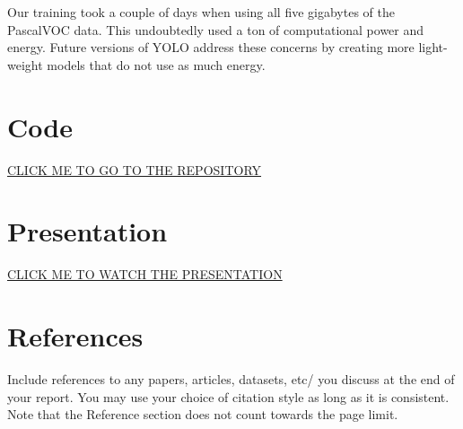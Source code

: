 \documentclass{article}
\begin{document}
Our training took a couple of days when using all five gigabytes of the PascalVOC data. This undoubtedly used a ton of computational power and energy. Future versions of YOLO address these concerns by creating more light-weight models that do not use as much energy.

\section{Code}
\href{https://github.com/briancha5431/NN_FinalProject_Brian_Erin_Isaac_Patrick}{CLICK ME TO GO TO THE REPOSITORY} \\

\section{Presentation}
\href{https://drive.google.com/file/d/1W-fz7uIHwSor__WOMhDkvaLkCyqpAY6q/view?usp=sharing}{CLICK ME TO WATCH THE PRESENTATION} \\


\section*{References}
Include references to any papers, articles, datasets, etc/ you discuss at the end of your report. You may use your choice of citation style as long as it is consistent.
Note that the Reference section does not count towards the page limit.
\medskip
\end{document}
